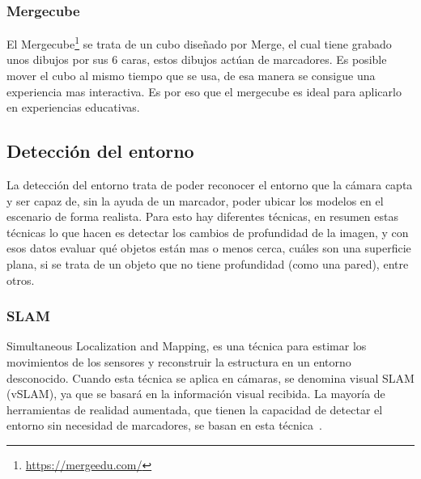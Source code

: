 







\subsubsection{Mergecube}\label{section:mergecube}

El Mergecube\footnote{\url{https://mergeedu.com/}} se trata de un cubo diseñado por Merge, el cual tiene grabado unos dibujos por sus 6 caras, estos dibujos actúan de marcadores. Es posible mover el cubo al mismo tiempo que se usa, de esa manera se consigue una experiencia mas interactiva. Es por eso que el mergecube es ideal para aplicarlo en experiencias educativas.


\subsection{Detección del entorno}

La detección del entorno trata de poder reconocer el entorno que la cámara capta y ser capaz de, sin la ayuda de un marcador, poder ubicar los modelos en el escenario de forma realista.
Para esto hay diferentes técnicas, en resumen estas técnicas lo que hacen es detectar los cambios de profundidad de la imagen, y con esos datos evaluar qué objetos están mas o menos cerca, cuáles son una superficie plana, si se trata de un objeto que no tiene profundidad (como una pared), entre otros.

\subsubsection{SLAM}

Simultaneous Localization and Mapping, es una técnica para estimar los movimientos de los sensores y reconstruir la estructura en un entorno desconocido. Cuando esta técnica se aplica en cámaras, se denomina visual SLAM (vSLAM), ya que se basará en la información visual recibida.
La mayoría de herramientas de realidad aumentada, que tienen la capacidad de detectar el entorno sin necesidad de marcadores, se basan en esta técnica~\cite{taketomi2017visual}.

